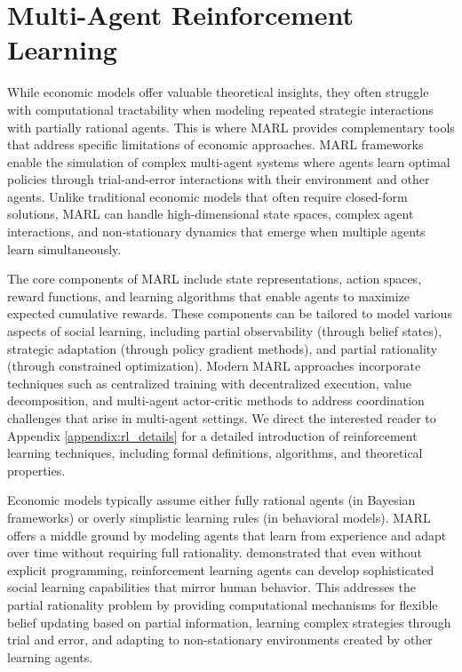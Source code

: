 \section{Multi-Agent Reinforcement Learning}

While economic models offer valuable theoretical insights, they often struggle with computational tractability when modeling repeated strategic interactions with partially rational agents. This is where MARL provides complementary tools that address specific limitations of economic approaches. MARL frameworks enable the simulation of complex multi-agent systems where agents learn optimal policies through trial-and-error interactions with their environment and other agents. Unlike traditional economic models that often require closed-form solutions, MARL can handle high-dimensional state spaces, complex agent interactions, and non-stationary dynamics that emerge when multiple agents learn simultaneously.

The core components of MARL include state representations, action spaces, reward functions, and learning algorithms that enable agents to maximize expected cumulative rewards. These components can be tailored to model various aspects of social learning, including partial observability (through belief states), strategic adaptation (through policy gradient methods), and partial rationality (through constrained optimization). Modern MARL approaches incorporate techniques such as centralized training with decentralized execution, value decomposition, and multi-agent actor-critic methods to address coordination challenges that arise in multi-agent settings. We direct the interested reader to Appendix \ref{appendix:rl_details} for a detailed introduction of reinforcement learning techniques, including formal definitions, algorithms, and theoretical properties.

Economic models typically assume either fully rational agents (in Bayesian frameworks) or overly simplistic learning rules (in behavioral models). MARL offers a middle ground by modeling agents that learn from experience and adapt over time without requiring full rationality. \citet{ndousse2021emergent} demonstrated that even without explicit programming, reinforcement learning agents can develop sophisticated social learning capabilities that mirror human behavior. This addresses the partial rationality problem by providing computational mechanisms for flexible belief updating based on partial information, learning complex strategies through trial and error, and adapting to non-stationary environments created by other learning agents.

